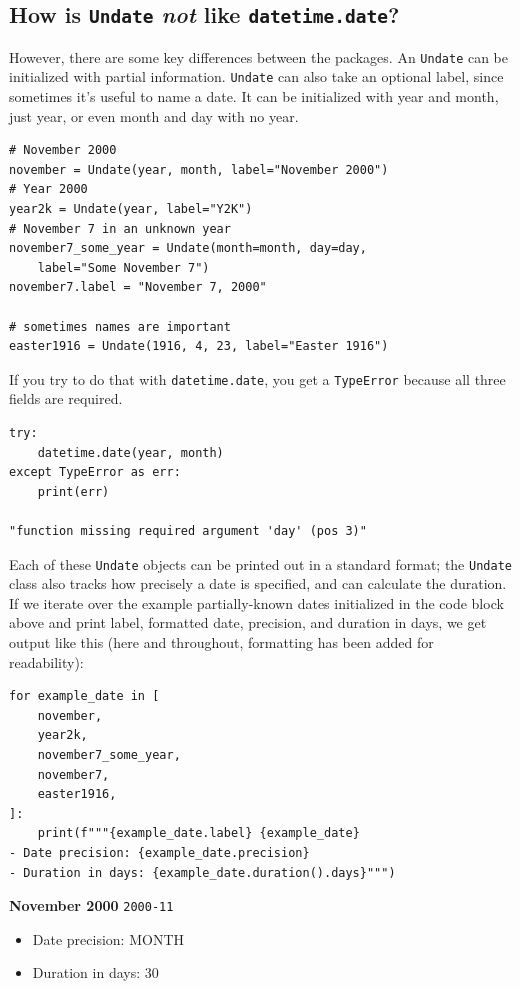 \documentclass[final]{anthology-ch} %
\begin{document}
\subsection{How is \texttt{Undate} \textit{not} like \texttt{datetime.date}?}

However, there are some key differences between the packages. An \texttt{Undate} can be initialized with partial information.  \texttt{Undate} can also take an optional label, since sometimes it's useful to name a date.  It can be initialized with year and month, just year, or even month and day with no year.

\begin{verbatim}
# November 2000
november = Undate(year, month, label="November 2000")
# Year 2000
year2k = Undate(year, label="Y2K")
# November 7 in an unknown year
november7_some_year = Undate(month=month, day=day, 
    label="Some November 7")
november7.label = "November 7, 2000"

# sometimes names are important
easter1916 = Undate(1916, 4, 23, label="Easter 1916")
\end{verbatim}

If you try to do that with \texttt{datetime.date}, you get a \texttt{TypeError} because all three fields are required.

\begin{verbatim}
try:
    datetime.date(year, month)
except TypeError as err:
    print(err)

"function missing required argument 'day' (pos 3)"
\end{verbatim}

Each of these \texttt{Undate} objects can be printed out in a standard format; the \texttt{Undate} class also tracks how precisely a date is specified, and can calculate the duration.  If we iterate over the example partially-known dates initialized in the code block above and print label, formatted date, precision, and duration in days, we get output like this (here and throughout, formatting has been added for readability):

\begin{verbatim}
for example_date in [
    november,
    year2k,
    november7_some_year,
    november7,
    easter1916,
]:
    print(f"""{example_date.label} {example_date}
- Date precision: {example_date.precision}
- Duration in days: {example_date.duration().days}""")
\end{verbatim}



\noindent
\textbf{November 2000} \texttt{2000-11}
\begin{itemize}
    \item Date precision: MONTH
    \item Duration in days: 30
\end{itemize}
\end{document}
